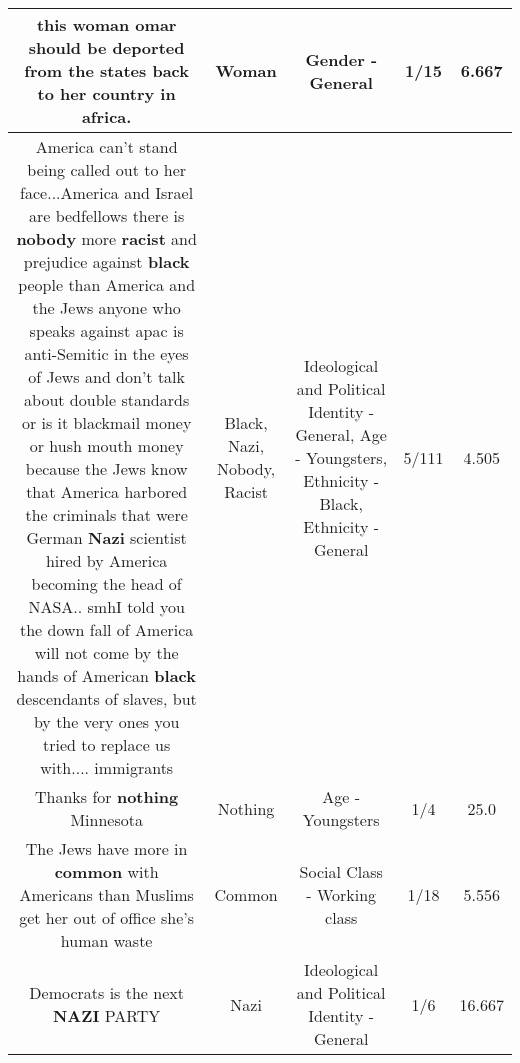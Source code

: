\documentclass[11pt]{article}
\newlength\mylength
\begin{document}
\begin{center}
\begin{longtable}{|C{.65\mylength}|C{.30\mylength}|C{.12\mylength}|C{.12\mylength}|C{.12\mylength}|}
  \small this \textbf{woman} omar should be deported from the states back to her country in africa.\normalsize   & Woman & Gender - General & 1/15 & 6.667 \\  \hline
  \small America can't stand being called out to her face...America and Israel are bedfellows there is \textbf{nobody} more \textbf{racist} and prejudice against \textbf{black} people than America and the Jews anyone who speaks against apac is anti-Semitic in the eyes of Jews and don't talk about double standards or is it blackmail money or hush mouth money because the Jews know that America harbored the criminals that were German \textbf{Nazi} scientist hired by America becoming the head of NASA.. smhI told you the down fall of America will not come by the hands of American \textbf{black} descendants of slaves, but by the very ones you tried to replace us with.... immigrants\normalsize   & Black, Nazi, Nobody, Racist &  Ideological and Political Identity - General, Age - Youngsters, Ethnicity - Black, Ethnicity - General & 5/111 & 4.505 \\  \hline
  \small Thanks for \textbf{nothing}  Minnesota\normalsize   & Nothing & Age - Youngsters & 1/4 & 25.0 \\  \hline
  \small The Jews have more in \textbf{common} with Americans than Muslims get her out of office she's human waste\normalsize   & Common & Social Class - Working class & 1/18 & 5.556 \\  \hline
  \small Democrats is the next \textbf{NAZI} PARTY\normalsize   & Nazi &  Ideological and Political Identity - General & 1/6 & 16.667 \\  \hline

\end{longtable}
\end{center}
\end{document}
